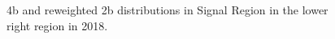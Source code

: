 \begin{figure}[ht]
 
 
    \caption{4b and reweighted 2b distributions in Signal Region in the lower right region in 2018.}
    \label{fig:lower-right-4b-SR-2018}
\end{figure}


